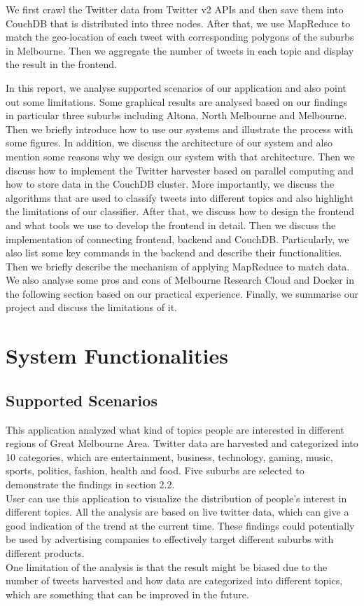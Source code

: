 \documentclass[parskip=full, 11pt]{article}
\begin{document}
We first crawl the Twitter data from Twitter v2 APIs and then save them into CouchDB that is distributed into three nodes. After that, we use MapReduce to match the geo-location of each tweet with corresponding polygons of the suburbs in Melbourne. Then we aggregate the number of tweets in each topic and display the result in the frontend. 

In this report, we analyse supported scenarios of our application and also point out some limitations. Some graphical results are analysed based on our findings in particular three suburbs including Altona, North Melbourne and Melbourne. Then we briefly introduce how to use our systems and illustrate the process with some figures. In addition, we discuss the architecture of our system and also mention some reasons why we design our system with that architecture. Then we discuss how to implement the Twitter harvester based on parallel computing and how to store data in the CouchDB cluster. More importantly, we discuss the algorithms that are used to classify tweets into different topics and also highlight the limitations of our classifier. After that, we discuss how to design the frontend and what tools we use to develop the frontend in detail. Then we discuss the implementation of connecting frontend, backend and CouchDB. Particularly, we also list some key commands in the backend and describe their functionalities. Then we briefly describe the mechanism of applying MapReduce to match data. We also analyse some pros and cons of Melbourne Research Cloud and Docker in the following section based on our practical experience. Finally, we summarise our project and discuss the limitations of it.


\section{System Functionalities}
\label{sec:System Functionalities}

\subsection{Supported Scenarios}
This application analyzed what kind of topics people are interested in different regions of Great Melbourne Area. Twitter data are harvested and categorized into 10 categories, which are entertainment, business, technology, gaming, music, sports, politics, fashion, health and food. Five suburbs are selected to demonstrate the findings in section 2.2. \\
User can use this application to visualize the distribution of people's interest in different topics. All the analysis are based on live twitter data, which can give a good indication of the trend at the current time. These findings could potentially be used by advertising companies to effectively target different suburbs with different products. \\
One limitation of the analysis is that the result might be biased due to the number of tweets harvested and how data are categorized into different topics, which are something that can be improved in the future.
\end{document}

